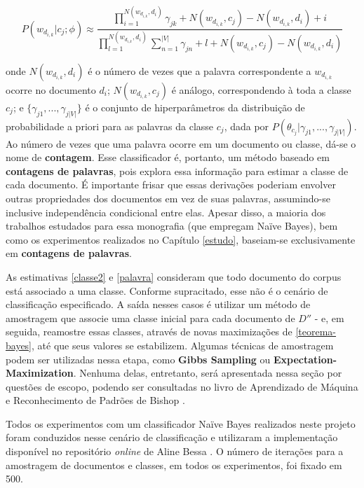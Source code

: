 \begin{equation}
\label{palavra}
\ensuremath{P(w_{d_{i,k}} | c_j ; \phi) \approx \frac{\prod_{i = 1}^{N(w_{d_{i,k}}, d_i)}\gamma_{jk} + N(w_{d_{i,k}}, c_j) - N(w_{d_{i,k}}, d_i) + i }{\prod_{l = 1}^{N(w_{d_{i,k}}, d_i)}\sum_{n = 1}^{|V|}\gamma_{jn} + l + N(w_{d_{i,k}}, c_j) - N(w_{d_{i,k}}, d_i)}}
\end{equation}

onde \ensuremath{N(w_{d_{i,k}}, d_i)} é o número de vezes que a palavra correspondente a \ensuremath{w_{d_{i,k}}} ocorre no documento \ensuremath{d_i}; \ensuremath{N(w_{d_{i,k}}, c_j)} é análogo, correspondendo à toda a classe \ensuremath{c_j}; e \ensuremath{\{\gamma_{j1}, ..., \gamma_{j|V|}\}} é o conjunto de hiperparâmetros da distribuição de probabilidade a priori para as palavras da classe \ensuremath{c_j}, dada por \ensuremath{P(\theta_{c_j} | \gamma_{j1}, ..., \gamma_{j|V|})}. Ao número de vezes que uma palavra ocorre em um documento ou classe, dá-se o nome de \textbf{contagem}. Esse classificador é, portanto, um método baseado em \textbf{contagens de palavras}, pois explora essa informação para estimar a classe de cada documento. É importante frisar que essas derivações poderiam envolver outras propriedades dos documentos em vez de suas palavras, assumindo-se inclusive independência condicional entre elas. Apesar disso, a maioria dos trabalhos estudados para essa monografia (que empregam Naïve Bayes), bem como os experimentos realizados no Capítulo \ref{estudo}, baseiam-se exclusivamente em \textbf{contagens de palavras}.  


As estimativas \ref{classe2} e \ref{palavra} consideram que todo documento do corpus está associado a uma classe. Conforme supracitado, esse não é o cenário de classificação especificado. A saída nesses casos é utilizar um método de amostragem que associe uma classe inicial para cada documento de  \ensuremath{D''} - e, em seguida, reamostre essas classes, através de novas maximizações de \ref{teorema-bayes}, até que seus valores se estabilizem. Algumas técnicas de amostragem podem ser utilizadas nessa etapa, como \textbf{Gibbs Sampling} ou \textbf{Expectation-Maximization}. Nenhuma delas, entretanto, será apresentada nessa seção por questões de escopo, podendo ser consultadas no livro de Aprendizado de Máquina e Reconhecimento de Padrões de Bishop \cite{bishop}. 

Todos os experimentos com um classificador Naïve Bayes realizados neste projeto foram conduzidos nesse cenário de classificação e utilizaram a implementação disponível no repositório \emph{online} de Aline Bessa \cite{alibezz-nb}. O número de iterações para a amostragem de documentos e classes, em todos os experimentos, foi fixado em 500.


